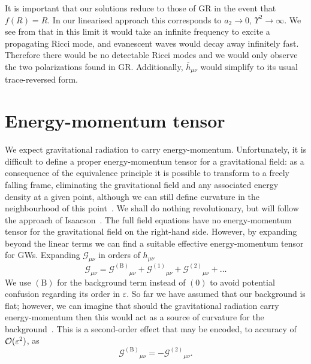 It is important that our solutions reduce to those of GR in the event that $f(R) = R$. In our linearised approach this corresponds to $a_2 \rightarrow 0$, $\Upsilon^2 \rightarrow \infty$. We see from  that in this limit it would take an infinite frequency to excite a propagating Ricci mode, and evanescent waves would decay away infinitely fast. Therefore there would be no detectable Ricci modes and we would only observe the two polarizations found in GR. Additionally, $\overline{h}_{\mu\nu}$ would simplify to its usual trace-reversed form.

\section{Energy-momentum tensor\label{sec:EM_tensor}}

We expect gravitational radiation to carry energy-momentum. Unfortunately, it is difficult to define a proper energy-momentum tensor for a gravitational field: as a consequence of the equivalence principle it is possible to transform to a freely falling frame, eliminating the gravitational field and any associated energy density at a given point, although we can still define curvature in the neighbourhood of this point~\cite{Misner1973, Hobson2006}. We shall do nothing revolutionary, but will follow the approach of Isaacson~\cite{Isaacson1968, Isaacson1968a}. The full field equations  have no energy-momentum tensor for the gravitational field on the right-hand side. However, by expanding beyond the linear terms we can find a suitable effective energy-momentum tensor for GWs. Expanding $\mathcal{G}_{\mu\nu}$ in orders of $h_{\mu\nu}$
\begin{equation}
\mathcal{G}_{\mu\nu} = {\mathcal{G}^{(\text{B})}}_{\mu\nu} + {\mathcal{G}^{(1)}}_{\mu\nu} + {\mathcal{G}^{(2)}}_{\mu\nu} + \ldots
\label{eq:G_exp}
\end{equation}
We use $(\text{B})$ for the background term instead of $(0)$ to avoid potential confusion regarding its order in $\varepsilon$. So far we have assumed that our background is flat; however, we can imagine that should the gravitational radiation carry energy-momentum then this would act as a source of curvature for the background~\cite{Wald1984}. This is a second-order effect that may be encoded, to accuracy of $\mathcal{O}({\varepsilon^2})$, as
\begin{equation}
{\mathcal{G}^{(\text{B})}}_{\mu\nu} = -{\mathcal{G}^{(2)}}_{\mu\nu}.
\end{equation}

